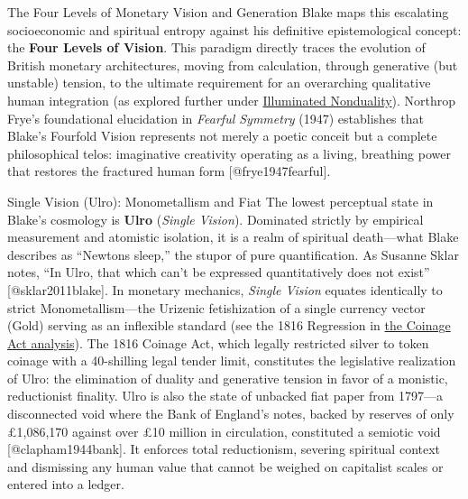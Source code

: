 \documentclass[
  ignorenonframetext,
]{beamer}
\author{\texorpdfstring{}{}}
\date{}
\begin{document}
\begin{frame}{The Four Levels of Monetary Vision and Generation}
\protect{}\label{the-four-levels-of-monetary-vision-and-generation}
Blake maps this escalating socioeconomic and spiritual entropy against
his definitive epistemological concept: the \textbf{Four Levels of
Vision}. This paradigm directly traces the evolution of British monetary
architectures, moving from calculation, through generative (but
unstable) tension, to the ultimate requirement for an overarching
qualitative human integration (as explored further under
\href{04a_illuminated_nonduality.md\#illuminated-nonduality-and-the-fourfold-vision}{Illuminated
Nonduality}). Northrop Frye's foundational elucidation in \emph{Fearful
Symmetry} (1947) establishes that Blake's Fourfold Vision represents not
merely a poetic conceit but a complete philosophical telos: imaginative
creativity operating as a living, breathing power that restores the
fractured human form {[}@frye1947fearful{]}.

\begin{block}{Single Vision (Ulro): Monometallism and Fiat}
\protect{}\label{single-vision-ulro-monometallism-and-fiat}
The lowest perceptual state in Blake's cosmology is \textbf{Ulro}
(\emph{Single Vision}). Dominated strictly by empirical measurement and
atomistic isolation, it is a realm of spiritual death---what Blake
describes as ``Newtons sleep,'' the stupor of pure quantification. As
Susanne Sklar notes, ``In Ulro, that which can't be expressed
quantitatively does not exist'' {[}@sklar2011blake{]}. In monetary
mechanics, \emph{Single Vision} equates identically to strict
Monometallism---the Urizenic fetishization of a single currency vector
(Gold) serving as an inflexible standard (see the 1816 Regression in
\href{04b_coinage_act_1816.md\#the-1816-coinage-act-as-topological-regression}{the
Coinage Act analysis}). The 1816 Coinage Act, which legally restricted
silver to token coinage with a 40-shilling legal tender limit,
constitutes the legislative realization of Ulro: the elimination of
duality and generative tension in favor of a monistic, reductionist
finality. Ulro is also the state of unbacked fiat paper from 1797---a
disconnected void where the Bank of England's notes, backed by reserves
of only £1,086,170 against over £10 million in circulation, constituted
a semiotic void {[}@clapham1944bank{]}. It enforces total reductionism,
severing spiritual context and dismissing any human value that cannot be
weighed on capitalist scales or entered into a ledger.
\end{block}


\end{frame}
\end{document}
